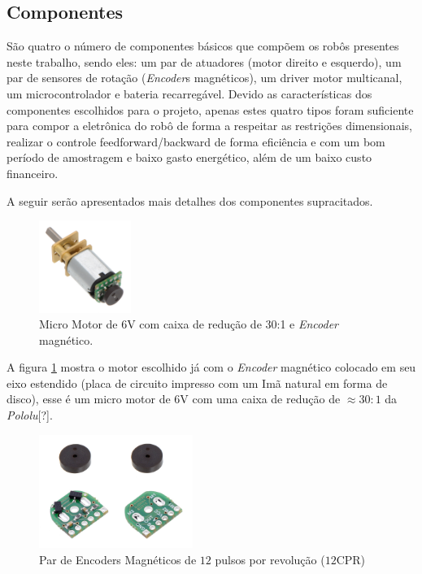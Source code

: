 \subsection{Componentes}

São quatro o número de componentes básicos que compõem os robôs presentes neste trabalho, sendo eles: um par de atuadores (motor direito e esquerdo), um par de sensores de rotação (\textit{Encoder}s magnéticos), um driver motor multicanal, um microcontrolador e bateria recarregável. Devido as características dos componentes escolhidos para o projeto, apenas estes quatro tipos foram suficiente para compor a eletrônica do robô de forma a respeitar as restrições dimensionais, realizar o controle feedforward/backward de forma eficiência e com um bom período de amostragem e baixo gasto energético, além de um baixo custo financeiro.

A seguir serão apresentados mais detalhes dos componentes supracitados.

\begin{figure}[H]
    \centering
    \includegraphics[width=3cm]{figuras/eletronica/motor_com_encoder.jpg}
    \caption{Micro Motor de 6V com caixa de redução de 30:1 e \textit{Encoder} magnético.}
    \label{fig:motor_com_encoder}
\end{figure}

A figura \ref{fig:motor_com_encoder} mostra o motor escolhido já com o \textit{Encoder} magnético colocado em seu eixo estendido (placa de circuito impresso com um Imã natural em forma de disco), esse é um micro motor de $6$V com uma caixa de redução de $\approx 30:1$ da \textit{Pololu}[?].

\begin{figure}[H]
    \centering
    \includegraphics[width=5cm]{figuras/eletronica/encoder_frente_verso.jpg}
    \caption{Par de Encoders Magnéticos de $12$ pulsos por revolução ($12$CPR)}
    \label{fig:encoder}
\end{figure}

